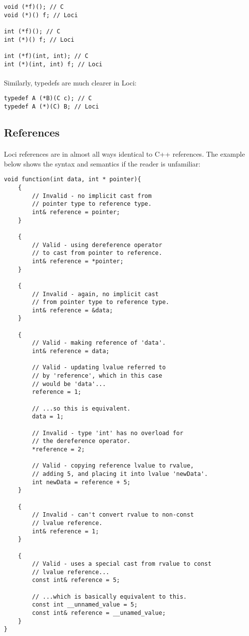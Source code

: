 \documentclass[12pt,twoside,notitlepage]{report}
\begin{document}
\begin{lstlisting}
void (*f)(); // C
void (*)() f; // Loci

int (*f)(); // C
int (*)() f; // Loci

int (*f)(int, int); // C
int (*)(int, int) f; // Loci
\end{lstlisting}


\paragraph{}
Similarly, typedefs are much clearer in Loci:


\begin{lstlisting}
typedef A (*B)(C c); // C
typedef A (*)(C) B; // Loci
\end{lstlisting}


\clearpage

\subsection{References}

\paragraph{}
Loci references are in almost all ways identical to C++ references. The example below shows the syntax and semantics if the reader is unfamiliar:

\begin{lstlisting}
void function(int data, int * pointer){
	{
		// Invalid - no implicit cast from
		// pointer type to reference type.
		int& reference = pointer;
	}
	
	{
		// Valid - using dereference operator
		// to cast from pointer to reference.
		int& reference = *pointer;
	}
	
	{
		// Invalid - again, no implicit cast
		// from pointer type to reference type.
		int& reference = &data;
	}
	
	{
		// Valid - making reference of 'data'.
		int& reference = data;
	
		// Valid - updating lvalue referred to
		// by 'reference', which in this case
		// would be 'data'...
		reference = 1;
		
		// ...so this is equivalent.
		data = 1;
		
		// Invalid - type 'int' has no overload for
		// the dereference operator.
		*reference = 2;
		
		// Valid - copying reference lvalue to rvalue,
		// adding 5, and placing it into lvalue 'newData'.
		int newData = reference + 5;
	}
	
	{
		// Invalid - can't convert rvalue to non-const
		// lvalue reference.
		int& reference = 1;
	}
	
	{	
		// Valid - uses a special cast from rvalue to const
		// lvalue reference...
		const int& reference = 5;
		
		// ...which is basically equivalent to this.
		const int __unnamed_value = 5;
		const int& reference = __unamed_value;
	}
}
\end{lstlisting}
\end{document}
